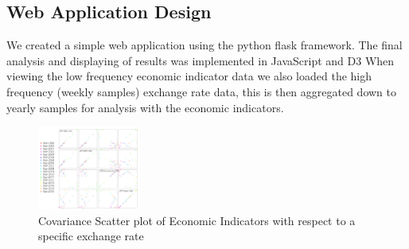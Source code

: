 \subsection{Web Application Design}

We created a simple web application using the python flask framework.
\newline
\newline
The final analysis and displaying of results was implemented in JavaScript and D3
\newline
\newline
When viewing the low frequency economic indicator data we also loaded the high frequency (weekly samples) exchange rate data, this is then aggregated down to yearly samples for analysis with the economic indicators.
\newline
 
\begin{figure}[!h]
	\begin{center}
		\includegraphics[width=0.30\textwidth]{web.jpg}
		\caption{Covariance Scatter plot of Economic Indicators with respect to a specific exchange rate}
		\label{scatter_plot}
	\end{center}
\end{figure}

